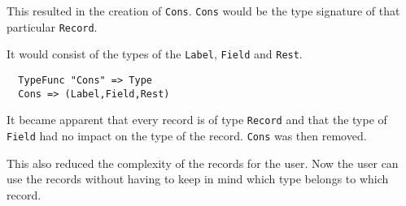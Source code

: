 This resulted in the creation of \texttt{Cons}.
\texttt{Cons} would be the type signature of that particular \texttt{Record}.

It would consist of the types of the \texttt{Label}, \texttt{Field} and \texttt{Rest}.

\begin{lstlisting}
  TypeFunc "Cons" => Type
  Cons => (Label,Field,Rest)
\end{lstlisting}

It became apparent that every record is of type \texttt{Record} and that the type of \texttt{Field} had no impact on the type of the record.
\texttt{Cons} was then removed.

This also reduced the complexity of the records for the user.
Now the user can use the records without having to keep in mind which type belongs to which record.

